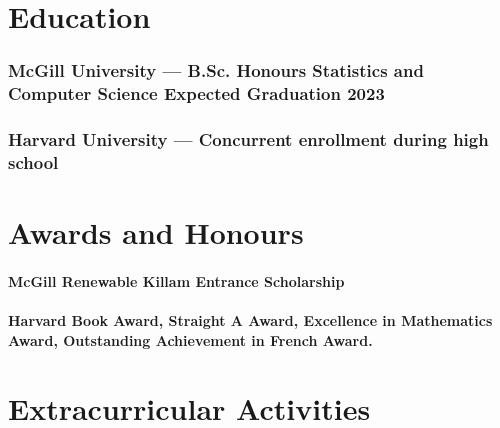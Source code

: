 \documentclass{article}
\begin{document}
\section{Education\hfill\normalsize }

\subsubsection{McGill University --- B.Sc. Honours Statistics and Computer Science \hfill Expected Graduation 2023}


\subsubsection{Harvard University --- Concurrent enrollment during high school}

% 

\section{Awards and Honours}

\paragraph{McGill Renewable Killam Entrance Scholarship}

\paragraph{Harvard Book Award, Straight A Award, Excellence in Mathematics Award, Outstanding Achievement in French Award.}


\section{Extracurricular Activities}
\end{document}
